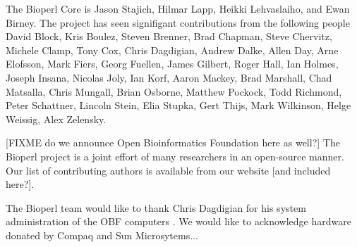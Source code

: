 \documentclass{article}
\begin{document}
\begin{twocolumn}
The Bioperl Core is Jason Stajich, Hilmar Lapp, Heikki Lehvaslaiho,
and Ewan Birney.  The project has seen signifigant contributions from
the following people David Block, Kris Boulez, Steven Brenner, Brad
Chapman, Steve Chervitz, Michele Clamp, Tony Cox, Chris Dagdigian,
Andrew Dalke, Allen Day, Arne Elofsson, Mark Fiers, Georg Fuellen,
James Gilbert, Roger Hall, Ian Holmes, Joseph Insana, Nicolas Joly,
Ian Korf, Aaron Mackey, Brad Marshall, Chad Matsalla, Chris Mungall,
Brian Osborne, Matthew Pockock, Todd Richmond, Peter Schattner,
Lincoln Stein, Elia Stupka, Gert Thijs, Mark Wilkinson, Helge Weissig,
Alex Zelensky.

 
[FIXME do we announce Open Bioinformatics Foundation here as well?]
The Bioperl project is a joint effort of many researchers in an
open-source manner.  Our list of contributing authors is available
from our website [and included here?]. 

The Bioperl team would like to thank Chris Dagdigian for his system
administration of the OBF computers .  We would like to acknowledge
hardware donated by Compaq and Sun Microsytems...


 

\end{twocolumn}
\end{document}
